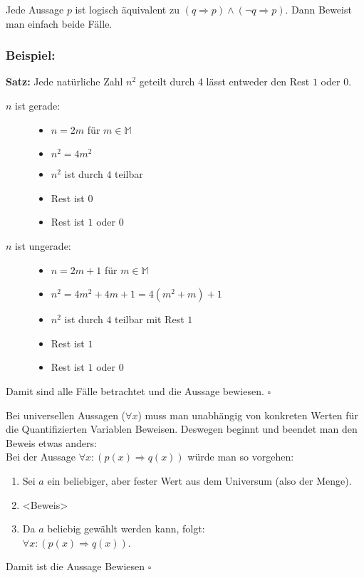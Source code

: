 \begin{framed} [Fallunterscheidung]
  Jede Aussage $p$ ist logisch äquivalent zu 
  $(q \Rightarrow p) \wedge (\neg q \Rightarrow p)$. Dann Beweist man einfach
  beide Fälle.

  \subsubsection*{Beispiel:}
  \textbf{Satz:} \dq{}Jede natürliche Zahl $n^2$ geteilt durch 4 lässt entweder
  den Rest $1$ oder $0$\dq{}.
  \begin{description}
    \item [$n$ ist gerade:] \hfill
      \begin{itemize}
        \item $n = 2m$ für $m \in \mathbb{M}$
        \item $n^2 = 4m^2$
        \item $n^2$ ist durch $4$ teilbar
        \item Rest ist $0$
        \item Rest ist $1$ oder $0$
      \end{itemize}
    \item [$n$ ist ungerade:] \hfill
      \begin{itemize}
        \item $n = 2m + 1$ für $m \in \mathbb{M}$
        \item $n^2 = 4m^2 + 4m + 1 = 4(m^2 + m) + 1$
        \item $n^2$ ist durch $4$ teilbar mit Rest $1$
        \item Rest ist $1$
        \item Rest ist $1$ oder $0$
      \end{itemize}
  \end{description}
  Damit sind alle Fälle betrachtet und die Aussage bewiesen. $\square$
\end{framed}


\begin{framed} 
  Bei universellen Aussagen ($\forall x$) muss man unabhängig von konkreten 
  Werten für die Quantifizierten Variablen Beweisen. Deswegen beginnt und 
  beendet man den Beweis etwas anders:\\
  Bei der Aussage $\forall x : (p(x) \Rightarrow q(x))$ würde man so vorgehen:
  \begin{enumerate}
    \item Sei $a$ ein beliebiger, aber fester Wert aus dem Universum 
          (also der Menge).
    \item <Beweis>
    \item Da $a$ beliebig gewählt werden kann, folgt:\\
          $\forall x : (p(x) \Rightarrow q(x))$.
  \end{enumerate}
  Damit ist die Aussage Bewiesen $\square$
\end{framed}


